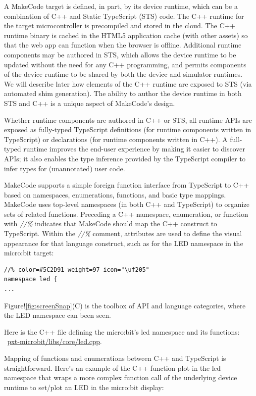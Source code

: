 A MakeCode target is defined, in part, by its device runtime, which can be a combination of C++ 
and Static TypeScript (STS) code. The C++ runtime for the target microcontroller is precompiled 
and stored in the cloud. The C++ runtime binary is cached in the HTML5 application cache (with 
other assets) so that the web app can function when the browser is offline. Additional runtime
components may be authored in STS, which allows the device runtime to be updated without the need
for any C++ programming, and permits components of the device runtime to be shared by both the device
and simulator runtimes.  We will describe later how elements of the C++ runtime are exposed to STS
(via automated shim generation). The ability to author the device runtime in both STS and C++ is
a unique aspect of MakeCode's design.

Whether runtime components are authored in C++ or STS, all runtime APIs are exposed as fully-typed
TypeScript definitions (for runtime components written in TypeScript) or declarations (for runtime
components written in C++). A full-typed runtime improves the end-user experience by making it easier
to discover APIs; it also enables the type inference provided by the TypeScript compiler to infer types
for (unannotated) user code.

MakeCode supports a simple foreign function interface from TypeScript to C++ based on namespaces,
enumerations, functions, and basic type mappings. MakeCode uses top-level namespaces (in both C++ and
TypeScript) to organize sets of related functions.  Preceding a C++ namespace, enumeration, or function
with \emph{//\%} indicates that MakeCode should map the C++ construct to TypeScript.
Within the \emph{//\%} comment, attributes are used to define the visual appearance for that
language construct, such as for the LED namespace in the micro:bit target:

\begin{lstlisting}
//% color=#5C2D91 weight=97 icon="\uf205"
namespace led { 
...
\end{lstlisting}

Figure!\ref{fig:screenSnap}(C) is the toolbox of API and language categories, where the LED
namespace can been seen. 


Here is the C++ file defining the micro:bit's led namespace and its functions:
~\href{https://github.com/Microsoft/pxt-microbit/blob/master/libs/core/led.cpp}{pxt-microbit/libs/core/led.cpp}.

Mapping of functions and enumerations between C++ and TypeScript is straightforward. 
Here's an example of the C++ function plot in the led namespace that wraps a more
complex function call of the underlying device runtime to set/plot an LED in the micro:bit display:


